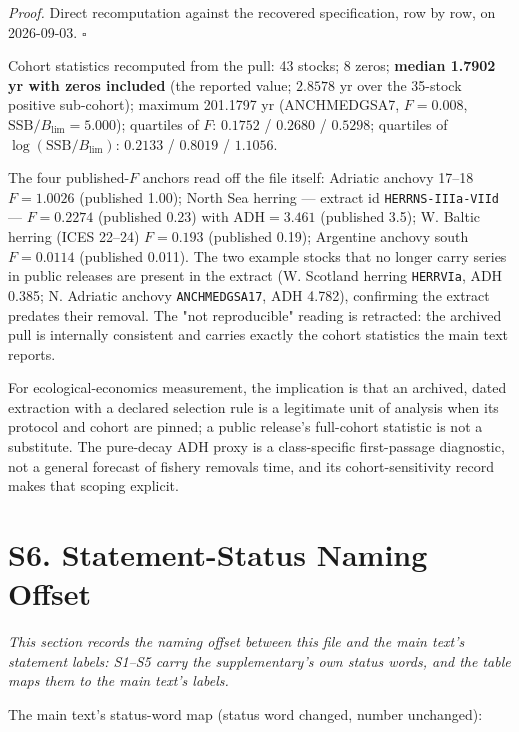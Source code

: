 \documentclass[11pt]{article}
\begin{document}
\emph{Proof.} Direct recomputation against the recovered specification, row by row, on 2026-09-03. \(\square\)

Cohort statistics recomputed from the pull: 43 stocks; 8 zeros; \textbf{median 1.7902 yr with zeros included} (the reported value; \(2.8578\) yr over the 35-stock positive sub-cohort); maximum 201.1797 yr (ANCHMEDGSA7, \(F=0.008\), \(\mathrm{SSB}/B_{\lim}=5.000\)); quartiles of \(F\): \(0.1752\) / \(0.2680\) / \(0.5298\); quartiles of \(\log(\mathrm{SSB}/B_{\lim})\): \(0.2133\) / \(0.8019\) / \(1.1056\).

The four published-\(F\) anchors read off the file itself: Adriatic anchovy 17--18 \(F=1.0026\) (published 1.00); North Sea herring --- extract id \texttt{HERRNS-\allowbreak{}IIIa-\allowbreak{}VIId} --- \(F=0.2274\) (published 0.23) with \(\mathrm{ADH}=3.461\) (published 3.5); W. Baltic herring (ICES 22--24) \(F=0.193\) (published 0.19); Argentine anchovy south \(F=0.0114\) (published 0.011). The two example stocks that no longer carry series in public releases are present in the extract (W. Scotland herring \texttt{HERRVIa}, ADH 0.385; N. Adriatic anchovy \texttt{ANCHMEDGSA17}, ADH 4.782), confirming the extract predates their removal. The "not reproducible" reading is retracted: the archived pull is internally consistent and carries exactly the cohort statistics the main text reports.

For ecological-economics measurement, the implication is that an archived, dated extraction with a declared selection rule is a legitimate unit of analysis when its protocol and cohort are pinned; a public release's full-cohort statistic is not a substitute. The pure-decay ADH proxy is a class-specific first-passage diagnostic, not a general forecast of fishery removals time, and its cohort-sensitivity record makes that scoping explicit.

\section*{S6. Statement-Status Naming Offset}\label{s6-statement-status-naming-offset}

\emph{This section records the naming offset between this file and the main text's statement labels: S1--S5 carry the supplementary's own status words, and the table maps them to the main text's labels.}

The main text's status-word map (status word changed, number unchanged):
\end{document}
